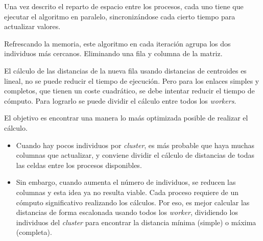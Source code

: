 		
		
		Una vez descrito el reparto de espacio entre los procesos, cada uno tiene que ejecutar el algoritmo en paralelo, sincronizándose cada cierto tiempo para actualizar valores.
		
		Refrescando la memoria, este algoritmo en cada iteración agrupa los dos individuos más cercanos. Eliminando una fila y columna de la matriz.
		
		\newpage
		
			
			
		
		El cálculo de las distancias de la nueva fila usando distancias de centroides es lineal, no se puede reducir el tiempo de ejecución. Pero para los enlaces simples y completos, que tienen un coste cuadrático, se debe intentar reducir el tiempo de cómputo. Para lograrlo se puede dividir el cálculo entre todos los \textit{workers}. 
		
		El objetivo es encontrar una manera lo maás optimizada posible de realizar el cálculo. 
		\begin{itemize}
			\item Cuando hay pocos individuos por \textit{cluster}, es más probable que haya muchas columnas que actualizar, y conviene dividir el cálculo de distancias de todas las celdas entre los procesos disponibles. 
			\item Sin embargo, cuando aumenta el número de individuos, se reducen las columnas y esta idea ya no resulta viable. Cada proceso requiere de un cómputo significativo realizando los cálculos. Por eso, es mejor calcular las distancias de forma escalonada usando todos los \textit{worker}, dividiendo los individuos del \textit{cluster} para encontrar la distancia mínima (simple) o máxima (completa).
		\end{itemize}
		

